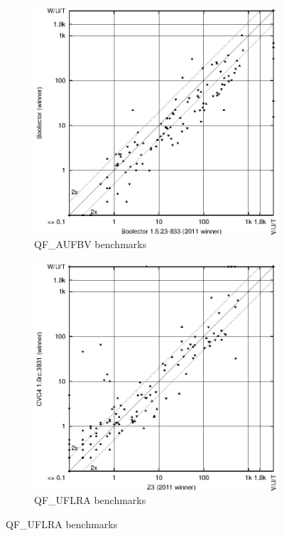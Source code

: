 \documentclass{llncs}
\begin{document}
\begin{figure}[ht]
\begin{subfigure}{0.45\textwidth}
	   \includegraphics[width=1\textwidth]{QF_AUFBV-scatter-improvement.eps}
	   \caption{QF\_AUFBV benchmarks}
	\end{subfigure}
\begin{subfigure}{0.45\textwidth}
	   \includegraphics[width=1\textwidth]{QF_UFLRA-scatter-improvement.eps}
	   \caption{QF\_UFLRA benchmarks}

\end{subfigure}
\end{figure}
\end{document}
